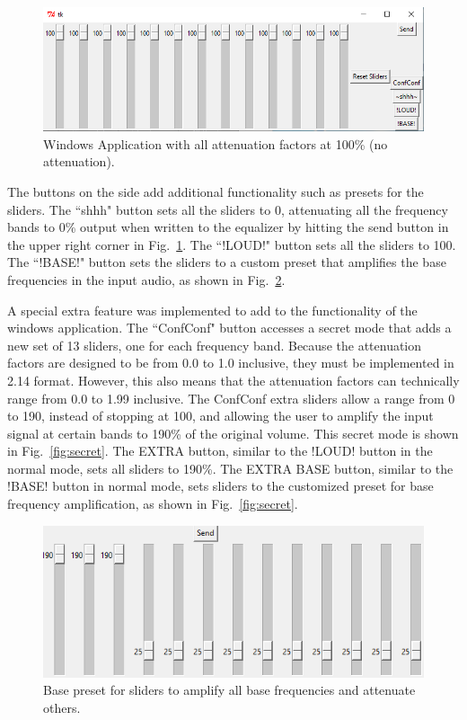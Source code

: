 \documentclass[journal]{IEEEtran} %
\begin{document}
\begin{figure}[htbp]
\centering
\includegraphics[width=0.9\linewidth]{Figures/EQ/gui.PNG}
\caption{\label{fig:gui}Windows Application with all attenuation factors at 100\% (no attenuation).}
\end{figure}

The buttons on the side add additional functionality such as presets for the sliders. The ``shhh" button sets all the sliders to 0, attenuating all the frequency bands to 0\% output when written to the equalizer by hitting the send button in the upper right corner in Fig.~\ref{fig:gui}. The ``!LOUD!" button sets all the sliders to 100. The ``!BASE!" button sets the sliders to a custom preset that amplifies the base frequencies in the input audio, as shown in Fig.~\ref{fig:preset}.

A special extra feature was implemented to add to the functionality of the windows application. The ``ConfConf" button accesses a secret mode that adds a new set of 13 sliders, one for each frequency band. Because the attenuation factors are designed to be from 0.0 to 1.0 inclusive, they must be implemented in 2.14 format. However, this also means that the attenuation factors can technically range from 0.0 to 1.99 inclusive. The ConfConf extra sliders allow a range from 0 to 190, instead of stopping at 100, and allowing the user to amplify the input signal at certain bands to 190\% of the original volume. This secret mode is shown in Fig.~\ref{fig:secret}. The EXTRA button, similar to the !LOUD! button in the normal mode, sets all sliders to 190\%. The EXTRA BASE button, similar to the !BASE! button in normal mode, sets sliders to the customized preset for base frequency amplification, as shown in Fig.~\ref{fig:secret}.

\begin{figure}[htbp]
\centering
\includegraphics[width=0.9\linewidth]{Figures/EQ/presets.PNG}
\caption{\label{fig:preset}Base preset for sliders to amplify all base frequencies and attenuate others.}
\end{figure}
\end{document}
